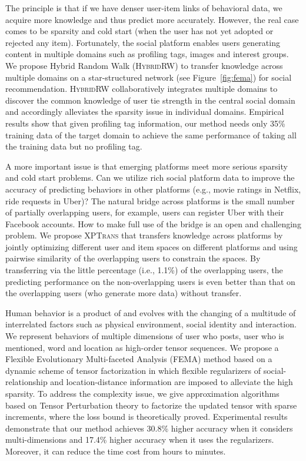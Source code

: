 \documentclass[10.5pt]{article}
\begin{document}
 The principle is that if we have denser user-item links of behavioral data, we acquire more knowledge and thus predict more accurately. However, the real case comes to be sparsity and cold start (when the user has not yet adopted or rejected any item). Fortunately, the social platform enables users generating content in multiple domains such as profiling tags, images and interest groups. We propose Hybrid Random Walk (\textsc{HybridRW}) \cite{jiang2012socialrecommendation} to transfer knowledge across multiple domains on a star-structured network (see Figure~\ref{fig:fema}) for social recommendation. \textsc{HybridRW} collaboratively integrates multiple domains to discover the common knowledge of user tie strength in the central social domain and accordingly alleviates the sparsity issue in individual domains. Empirical results show that given profiling tag information, our method needs only 35\% training data of the target domain to achieve the same performance of taking all the training data but no profiling tag.

 A more important issue is that emerging platforms meet more serious sparsity and cold start problems. Can we utilize rich social platform data to improve the accuracy of predicting behaviors in other platforms (e.g., movie ratings in Netflix, ride requests in Uber)? The natural bridge across platforms is the small number of partially overlapping users, for example, users can register Uber with their Facebook accounts. How to make full use of the bridge is an open and challenging problem. We propose \textsc{XPTrans} \cite{jiang2016little} that transfers knowledge across platforms by jointly optimizing different user and item spaces on different platforms and using pairwise similarity of the overlapping users to constrain the spaces. By transferring via the little percentage (i.e., 1.1\%) of the overlapping users, the predicting performance on the non-overlapping users is even better than that on the overlapping users (who generate more data) without transfer.

 Human behavior is a product of and evolves with the changing of a multitude of interrelated factors such as physical environment, social identity and interaction. We represent behaviors of multiple dimensions of user who posts, user who is mentioned, word and location as high-order tensor sequences. We propose a Flexible Evolutionary Multi-faceted Analysis (\textsc{FEMA}) method \cite{jiang2014fema} based on a dynamic scheme of tensor factorization in which flexible regularizers of social-relationship and location-distance information are imposed to alleviate the high sparsity. To address the complexity issue, we give approximation algorithms based on Tensor Perturbation theory to factorize the updated tensor with sparse increments, where the loss bound is theoretically proved. Experimental results demonstrate that our method achieves 30.8\% higher accuracy when it considers multi-dimensions and 17.4\% higher accuracy when it uses the regularizers. Moreover, it can reduce the time cost from hours to minutes.
\end{document}
